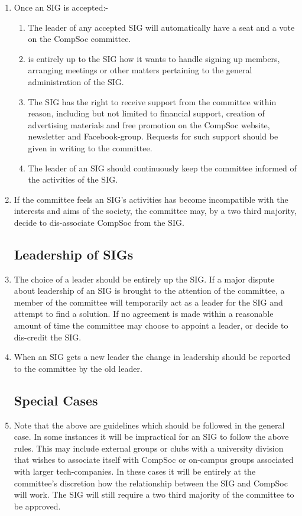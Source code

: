 \documentclass{article}
\begin{document}
\begin{enumerate}
  \item Once an SIG is accepted:-
    \begin{enumerate}
      \item The leader of any accepted SIG will automatically have a seat and a
        vote on the CompSoc committee.
      \item is entirely up to the SIG how it wants to handle signing up members,
        arranging meetings or other matters pertaining to the general
        administration of the SIG.
      \item The SIG has the right to receive support from the committee within
        reason, including but not limited to financial support, creation of
        advertising materials and free promotion on the CompSoc website,
        newsletter and Facebook-group. Requests for such support should
        be given in writing to the committee.
      \item The leader of an SIG should continuously keep the committee informed
        of the activities of the SIG.
    \end{enumerate}

    
  \item If the committee feels an SIG’s activities has become incompatible with
    the interests and aims of the society, the committee may, by a two third
    majority, decide to dis-associate CompSoc from the SIG.

  \subsection{Leadership of SIGs}

  \item The choice of a leader should be entirely up the SIG. If a major dispute
    about leadership of an SIG is brought to the attention of the committee, a
    member of the committee will temporarily act as a leader for the SIG and
    attempt to find a solution. If no agreement is made within a reasonable
    amount of time the committee may choose to appoint a leader, or decide
    to dis-credit the SIG.

  \item When an SIG gets a new leader the change in leadership should be reported
    to the committee by the old leader.

  \subsection{Special Cases}

  \item Note that the above are guidelines which should be followed in the general
    case. In some instances it will be impractical for an SIG to follow the
    above rules. This may include external groups or clubs with a university
    division that wishes to associate itself with CompSoc or on-campus groups
    associated with larger tech-companies. In these cases it will be entirely
    at the committee’s discretion how the relationship between the SIG and
    CompSoc will work. The SIG will still require a two third majority of the
    committee to be approved.

\end{enumerate}
\end{document}
